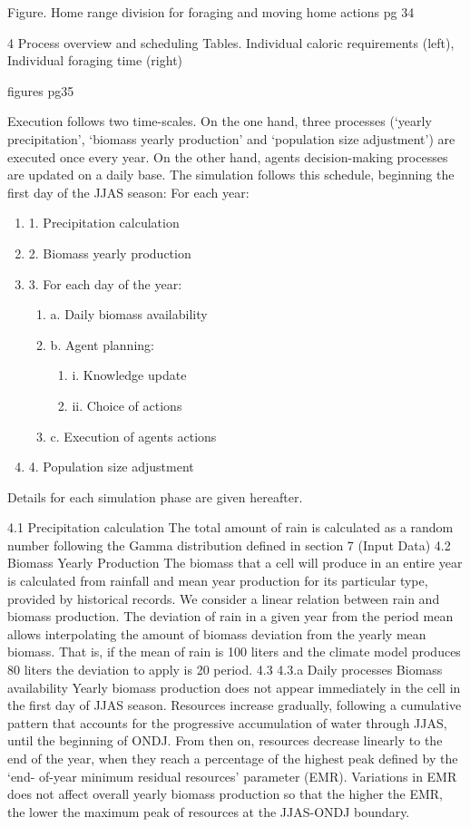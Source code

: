 Figure. Home range division for foraging and moving home actions
pg 34

4
Process overview and scheduling
Tables. Individual caloric requirements (left), Individual foraging time (right)

figures pg35 

Execution follows two time-scales. On the one hand, three processes (‘yearly precipitation’, ‘biomass
yearly production’ and ‘population size adjustment’) are executed once every year. On the other hand,
agents decision-making processes are updated on a daily base. The simulation follows this schedule,
beginning the first day of the JJAS season:
For each year:
\begin{enumerate}
	\item 1. Precipitation calculation
	\item 2. Biomass yearly production
	\item 3. For each day of the year:
	\begin{enumerate}
		\item a. Daily biomass availability
		\item b. Agent planning:
		\begin{enumerate}
			\item i. Knowledge update
			\item ii. Choice of actions
		\end{enumerate}
		\item c. Execution of agents actions
	\end{enumerate}
	\item 4. Population size adjustment
\end{enumerate}


Details for each simulation phase are given hereafter.


4.1 Precipitation calculation
The total amount of rain is calculated as a random number following the Gamma distribution defined in
section 7 (Input Data)
4.2 Biomass Yearly Production
The biomass that a cell will produce in an entire year is calculated from rainfall and mean year
production for its particular type, provided by historical records.
We consider a linear relation between rain and biomass production. The deviation of rain in a given
year from the period mean allows interpolating the amount of biomass deviation from the yearly mean
biomass. That is, if the mean of rain is 100 liters and the climate model produces 80 liters the deviation
to apply is 20%
period.
4.3
4.3.a
Daily processes
Biomass availability
Yearly biomass production does not appear immediately in the cell in the first day of JJAS season.
Resources increase gradually, following a cumulative pattern that accounts for the progressive
accumulation of water through JJAS, until the beginning of ONDJ. From then on, resources decrease
linearly to the end of the year, when they reach a percentage of the highest peak defined by the ‘end-
of-year minimum residual resources’ parameter (EMR). Variations in EMR does not affect overall
yearly biomass production so that the higher the EMR, the lower the maximum peak of resources at
the JJAS-ONDJ boundary.


